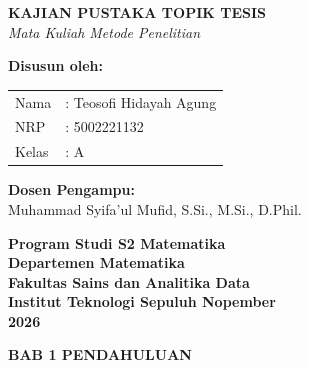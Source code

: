 \documentclass[12pt,a4paper]{article}
\begin{document}
\thispagestyle{empty}

\begin{center}
      \textbf{\LARGE KAJIAN PUSTAKA TOPIK TESIS}\\[0.5cm]
      \textit{Mata Kuliah Metode Penelitian}
\end{center}

\vfill

\noindent
\textbf{Disusun oleh:}\\[0.3cm]
\begin{tabular}{@{}p{1.2cm}p{7.5cm}@{}}
      Nama  & : Teosofi Hidayah Agung \\
      NRP   & : 5002221132            \\
      Kelas & : A                     \\
\end{tabular}



\noindent
\textbf{Dosen Pengampu:}\\[0.3cm]
\mbox{}Muhammad Syifa'ul Mufid, S.Si., M.Si., D.Phil.

\vfill

\begin{center}
      \textbf{Program Studi S2 Matematika}\\
      \textbf{Departemen Matematika}\\
      \textbf{Fakultas Sains dan Analitika Data}\\
      \textbf{Institut Teknologi Sepuluh Nopember}\\
      \textbf{2026}
\end{center}

\newpage
\setcounter{page}{1}

\noindent\textbf{\Large BAB 1 PENDAHULUAN}\par\bigskip
\end{document}
